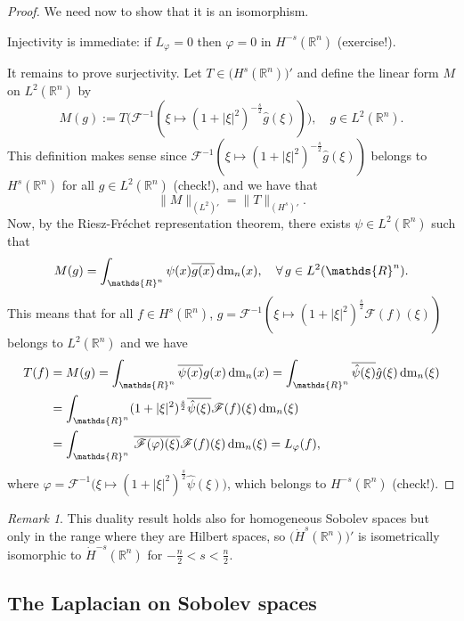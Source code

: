 \documentclass[a4paper, 12pt]{article}
\theoremstyle{plain}
\theoremstyle{definition}
\theoremstyle{remark}
\newtheorem{remark}[proposition]{Remark}
\numberwithin{equation}{section}
\begin{document}
\begin{proof}
We need now to show that it is an isomorphism.

\noindent
Injectivity is immediate: if $L_\varphi=0$ then $\varphi=0$ in $H^{-s}({\mathds{R}}^n)$ (exercise!). 

\noindent
It remains to prove surjectivity. Let $T\in \bigl(H^s({\mathds{R}}^n)\bigr)'$ and define the linear form $M$ on $L^2({\mathds{R}}^n)$ by
\[
M(g):=T\bigl({\mathscr{F}}^{-1}(\xi\mapsto (1+|\xi|^2)^{-\frac{s}{2}}\hat{g}(\xi))\bigr), \quad g\in L^2({\mathds{R}}^n).
\]
This definition makes sense since ${\mathscr{F}}^{-1}(\xi\mapsto (1+|\xi|^2)^{-\frac{s}{2}}\hat{g}(\xi))$ belongs to 
$H^s({\mathds{R}}^n)$ for all $g\in L^2({\mathds{R}}^n)$ (check!), and we have that
\[
\|M\|_{(L^2)'}=\|T\|_{(H^s)'}.
\]
Now, by the Riesz-Fr\'echet representation theorem, there exists $\psi\in L^2({\mathds{R}}^n)$ such that
\[
M(g)=\int_{{\mathds{R}}^n} \psi(x)\overline{g(x)}\,{\rm dm}_n(x), \quad \forall\,g\in L^2({\mathds{R}}^n).
\]
This means that for all $f\in H^s({\mathds{R}}^n)$, $g={\mathscr{F}}^{-1}(\xi\mapsto (1+|\xi|^2)^{\frac{s}{2}}{\mathscr{F}}(f)(\xi))$ belongs
to $L^2({\mathds{R}}^n)$ and we have
%
\begin{align*}
T(f)&=M(g)= \int_{{\mathds{R}}^n} \overline{\psi(x)} g(x)\,{\rm dm}_n(x)
=  \int_{{\mathds{R}}^n} \overline{\hat{\psi}(\xi)}\hat{g}(\xi)\,{\rm dm}_n(\xi)\\
&= \int_{{\mathds{R}}^n} (1+|\xi|^2)^{\frac{s}{2}} \overline{\hat{\psi}(\xi)} {\mathscr{F}}(f)(\xi)\,{\rm dm}_n(\xi)\\
&= \int_{{\mathds{R}}^n} \,\overline{{\mathscr{F}}(\varphi)(\xi)}{\mathscr{F}}(f)(\xi)\,{\rm dm}_n(\xi)
=L_\varphi(f),
\end{align*}
%
where $\varphi={\mathscr{F}}^{-1}\bigl(\xi\mapsto (1+|\xi|^2)^{\frac{s}{2}} \hat{\psi}(\xi)\bigr)$, which belongs to 
$H^{-s}({\mathds{R}}^n)$ (check!).
\end{proof}

\begin{remark}
This duality result holds also for homogeneous Sobolev spaces but only in the range where they are Hilbert spaces, so
$\bigl(\dot H^s({\mathds{R}}^n)\bigr)'$ is isometrically isomorphic to $\dot H^{-s}({\mathds{R}}^n)$ for $-\frac{n}{2}<s<\frac{n}{2}$.
\end{remark}

\subsection{The Laplacian on Sobolev spaces}
\end{document}
